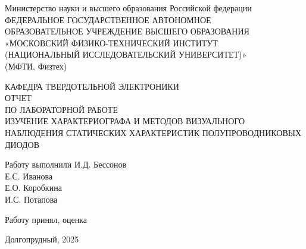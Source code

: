 \documentclass[a4paper, 12pt]{article}
\begin{document}
\begin{titlepage}
    \newpage
    \begin{center}
     Министерство науки и высшего образования Российской федерации \\ ФЕДЕРАЛЬНОЕ ГОСУДАРСТВЕННОЕ АВТОНОМНОЕ \\ ОБРАЗОВАТЕЛЬНОЕ УЧРЕЖДЕНИЕ ВЫСШЕГО ОБРАЗОВАНИЯ \\ «МОСКОВСКИЙ ФИЗИКО-ТЕХНИЧЕСКИЙ ИНСТИТУТ \\ (НАЦИОНАЛЬНЫЙ ИССЛЕДОВАТЕЛЬСКИЙ УНИВЕРСИТЕТ)» \\ (МФТИ, Физтех)
    \end{center}
    
    \vspace{15em}
    
    \begin{center}
    КАФЕДРА ТВЕРДОТЕЛЬНОЙ ЭЛЕКТРОНИКИ \\
    \vspace{1em}
    ОТЧЕТ\\
    ПО ЛАБОРАТОРНОЙ РАБОТЕ \\
    \vspace{1em}
    ИЗУЧЕНИЕ ХАРАКТЕРИОГРАФА И МЕТОДОВ ВИЗУАЛЬНОГО НАБЛЮДЕНИЯ СТАТИЧЕСКИХ ХАРАКТЕРИСТИК ПОЛУПРОВОДНИКОВЫХ ДИОДОВ
    \end{center}

    \vspace{10em}
    \begin{flushleft}
        Работу выполнили \hspace{17em} \underline{\hspace{3cm}}
        И.Д. Бессонов \\
         \hspace{26em} \underline{\hspace{3cm}} Е.С. Иванова \\
          \hspace{26em} \underline{\hspace{2.6cm}} Е.О. Коробкина\\
        \hspace{26em}
        И.С. Потапова
    \end{flushleft}

    \vspace{1em}

    \begin{flushleft}
        Работу принял, оценка
        \hspace{15em}
    \end{flushleft}

    \vspace{5em}
    
    \begin{center}
        Долгопрудный, 2025
    \end{center}
\end{titlepage}
\end{document}
